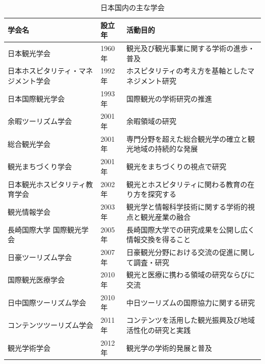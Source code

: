 \documentclass{jsarticle}
\begin{document}
\begin{table}[!h]
\small
\caption{日本国内の主な学会\cite{japanese_society_list}}
\begin{center}
\begin{tabular}{lll}
\label{japanese_society}
学会名 & 設立年 & 活動目的 \\ \hline
日本観光学会                            & 1960年 & 観光及び観光事業に関する学術の進歩・普及\cite{society_tourism}  \\
日本ホスピタリティ・マネジメント学会    & 1992年 & ホスピタリティの考え方を基軸としたマネジメント研究\cite{society_hm}  \\
日本国際観光学会                        & 1993年 & 国際観光の学術研究の推進\cite{society_jafit} \\
余暇ツーリズム学会                      & 2001年 & 余暇領域の研究\cite{society_yoka} \\
総合観光学会                            & 2001年 & 専門分野を超えた総合観光学の確立と観光地域の持続的な発展\cite{society_afz} \\
観光まちづくり学会                      & 2001年 & 観光をまちづくりの視点で研究\cite{society_m}  \\
日本観光ホスピタリティ教育学会          & 2002年 & 観光とホスピタリティに関わる教育の在り方を探究する\cite{society_jsthe}  \\
観光情報学会                            & 2003年 & 観光学と情報科学技術に関する学術的視点と観光産業の融合\cite{society_sti}  \\
長崎国際大学 国際観光学会               & 2005年 & 長崎国際大学での研究成果を公開し広く情報交換を得ること\cite{society_niu}  \\
日豪ツーリズム学会                      & 2007年 & 日豪観光分野における交流の促進に関して調査・研究\cite{society_jatf} \\
国際観光医療学会                        & 2010年 & 観光と医療に携わる領域の研究ならびに交流\cite{society_iatm}  \\
日中国際ツーリズム学会                  & 2010年 & 中日ツーリズムの国際協力に関する研究\cite{society_duan}  \\
コンテンツツーリズム学会                & 2011年 & コンテンツを活用した観光振興及び地域活性化の研究と実践\cite{society_ct}  \\
観光学術学会                            & 2012年 & 観光学の学術的発展と普及\cite{society_jsts}  \\
\end{tabular}
\end{center}
\end{table}
\end{document}
